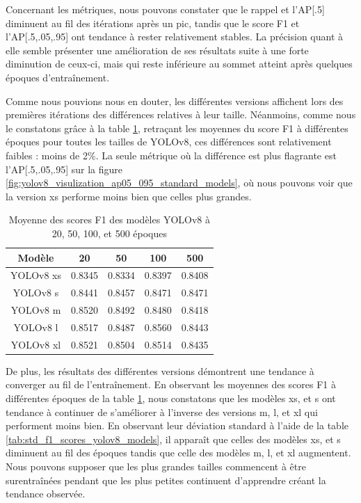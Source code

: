 Concernant les métriques, nous pouvons constater que le rappel et l'AP[.5] diminuent au fil des itérations après un pic, tandis que le score F1 et l'AP[.5,.05,.95] ont tendance à rester relativement stables. La précision quant à elle semble présenter une amélioration de ses résultats suite à une forte diminution de ceux-ci, mais qui reste inférieure au sommet atteint après quelques époques d'entraînement.

Comme nous pouvions nous en douter, les différentes versions affichent lors des premières itérations des différences relatives à leur taille. Néanmoins, comme nous le constatons grâce à la table \ref{tab:mean_f1_scores_yolov8_models}, retraçant les moyennes du score F1 à différentes époques pour toutes les tailles de YOLOv8, ces différences sont relativement faibles : moins de 2\%. La seule métrique où la différence est plus flagrante est l'AP[.5,.05,.95] sur la figure \ref{fig:yolov8_visulization_ap05_095_standard_models}, où nous pouvons voir que la version xs performe moins bien que celles plus grandes.

\begin{table}[!ht]
    \caption{Moyenne des scores F1 des modèles YOLOv8 à 20, 50, 100, et 500 époques}
    \label{tab:mean_f1_scores_yolov8_models}
    \centering
    \begin{tabular}{ |c||c|c|c|c|  }
        \hline
        \rowcolor{gray!50}
        Modèle & 20 & 50 & 100 & 500\\
        \hline
        YOLOv8 xs & 0.8345 & 0.8334 & 0.8397 & 0.8408\\
        YOLOv8 s & 0.8441 & 0.8457 & 0.8471 & 0.8471\\
        YOLOv8 m & 0.8520 & 0.8492 & 0.8480 & 0.8418\\
        YOLOv8 l & 0.8517 & 0.8487 & 0.8560 & 0.8443\\
        YOLOv8 xl & 0.8521 & 0.8504 & 0.8514 & 0.8435\\
        \hline
    \end{tabular}
\end{table}

De plus, les résultats des différentes versions démontrent une tendance à converger au fil de l'entraînement. En observant les moyennes des scores F1 à différentes époques de la table \ref{tab:mean_f1_scores_yolov8_models}, nous constatons que les modèles xs, et s ont tendance à continuer de s'améliorer à l'inverse des versions m, l, et xl qui performent moins bien. En observant leur déviation standard à l'aide de la table \ref{tab:std_f1_scores_yolov8_models}, il apparaît que celles des modèles xs, et s diminuent au fil des époques tandis que celle des modèles m, l, et xl augmentent. Nous pouvons supposer que les plus grandes tailles commencent à être surentraînées pendant que les plus petites continuent d'apprendre créant la tendance observée.

